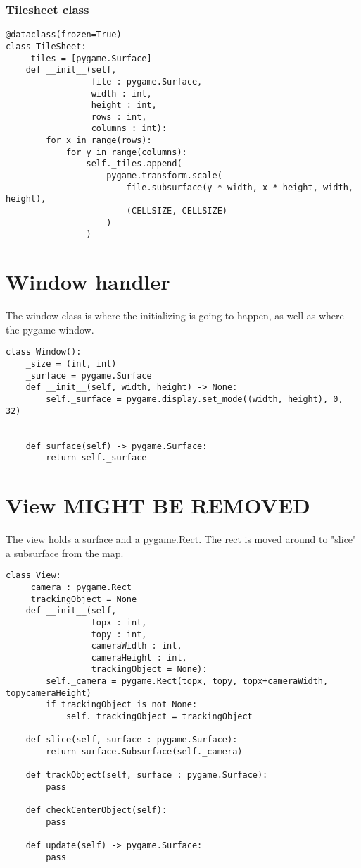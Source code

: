 \documentclass[11pt]{article}
\begin{document}
\subsubsection{Tilesheet class}
\label{sec:orgde1f412}

\begin{verbatim}
@dataclass(frozen=True)
class TileSheet:
    _tiles = [pygame.Surface]
    def __init__(self,
                 file : pygame.Surface,
                 width : int,
                 height : int,
                 rows : int,
                 columns : int):
        for x in range(rows):
            for y in range(columns):
                self._tiles.append(
                    pygame.transform.scale(
                        file.subsurface(y * width, x * height, width, height),
                        (CELLSIZE, CELLSIZE)
                    )
                )
\end{verbatim}

\section{Window handler}
\label{sec:org7ab670c}

The window class is where the initializing is going to happen, as well as where the pygame window.


\begin{verbatim}
class Window():
    _size = (int, int)
    _surface = pygame.Surface
    def __init__(self, width, height) -> None:
        self._surface = pygame.display.set_mode((width, height), 0, 32)

        
    def surface(self) -> pygame.Surface:
        return self._surface
\end{verbatim}


\section{View MIGHT BE REMOVED}
\label{sec:org06796e7}

The view holds a surface and a pygame.Rect. The rect is moved around to "slice" a subsurface from the map. 



\begin{verbatim}
class View:
    _camera : pygame.Rect
    _trackingObject = None
    def __init__(self,
                 topx : int,
                 topy : int,
                 cameraWidth : int,
                 cameraHeight : int,
                 trackingObject = None):
        self._camera = pygame.Rect(topx, topy, topx+cameraWidth, topycameraHeight)
        if trackingObject is not None:
            self._trackingObject = trackingObject

    def slice(self, surface : pygame.Surface):
        return surface.Subsurface(self._camera)

    def trackObject(self, surface : pygame.Surface):
        pass

    def checkCenterObject(self):
        pass

    def update(self) -> pygame.Surface:
        pass
\end{verbatim}
\end{document}
